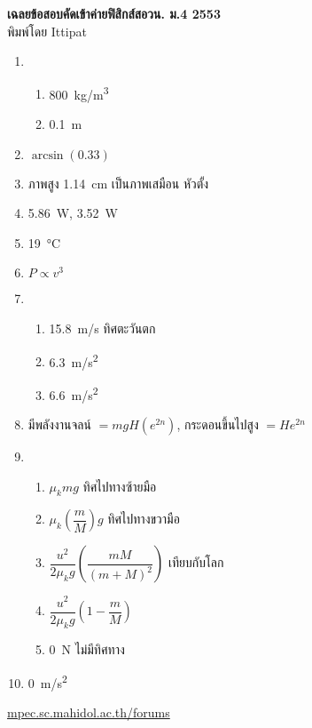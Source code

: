 \documentclass[a4paper,12pt]{article}
\begin{document}
\thispagestyle{empty}
\begin{center}
	{\huge \textbf{เฉลยข้อสอบคัดเข้าค่ายฟิสิกส์สอวน. ม.\textenglish{4} 2553}}\\
	พิมพ์โดย Ittipat\\
\end{center}
\begin{enumerate}
	\item \
	\begin{enumerate}
		\item \SI{800}{kg/m^3}
		\item \SI{0.1}{m}
	\end{enumerate}
	\item \(\arcsin (0.33)\)
	\item ภาพสูง  \SI{1.14}{cm}  เป็นภาพเสมือน หัวตั้ง
	\item \SI{5.86}{W}, \SI{3.52}{W}
	\item \SI{19}{\celsius}
	\item \(P\propto v^3\)
	\item \
	\begin{enumerate}
		\item \SI{15.8}{m/s} ทิศตะวันตก
		\item \SI{6.3}{m/s^2}
		\item \SI{6.6}{m/s^2}
	\end{enumerate}
	\item มีพลังงานจลน์ \(=mgH(e^{2n})\), กระดอนขึ้นไปสูง \(=He^{2n}\)  
	\item \
	\begin{enumerate}
		\item \(\mu_k mg\)  ทิศไปทางซ้ายมือ
		\item \(\mu_k\left( \dfrac{m}{M}\right)  g \)   ทิศไปทางขวามือ
		\item \(\dfrac{u^2}{2\mu_k g} \left(\dfrac{mM}{(m+M)^2}\right)\)  เทียบกับโลก
		\item \(\dfrac{u^2}{2\mu_k g}\left(1- \dfrac{m}{M}\right)\)
		\item \SI{0}{N}  ไม่มีทิศทาง
	\end{enumerate}
	\item \SI{0}{m/s^2}
\end{enumerate}
\vfill	
\begin{center}
	\href{http://mpec.sc.mahidol.ac.th/forums/}{mpec.sc.mahidol.ac.th/forums}
\end{center}
\end{document}
